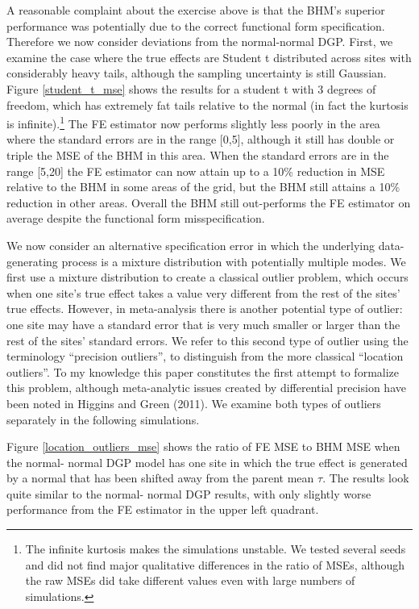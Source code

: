 \documentclass[12pt]{article}
\begin{document}
A reasonable complaint about the exercise above is that the BHM's superior performance was potentially due to the correct functional form specification. Therefore we now consider deviations from the  normal-normal DGP. First, we examine the case where the true effects are Student t distributed across sites with considerably heavy tails, although the sampling uncertainty is still Gaussian. Figure \ref{student_t_mse} shows the results for a student t with 3 degrees of freedom, which has extremely fat tails relative to the  normal (in fact the kurtosis is infinite).\footnote{The infinite kurtosis makes the simulations unstable. We tested several seeds and did not find major qualitative differences in the ratio of MSEs, although the raw MSEs did take different values even with large numbers of simulations.} The FE estimator now performs slightly less poorly in the area where the standard errors are in the range [0,5], although it still has double or triple the MSE of the BHM in this area. When the standard errors are in the range [5,20] the FE estimator can now attain up to a 10\% reduction in MSE relative to the BHM in some areas of the grid, but the BHM still attains a 10\% reduction in other areas. Overall the BHM still out-performs the FE estimator on average despite the functional form misspecification.

We now consider an alternative specification error in which the underlying data-generating process is a mixture distribution with potentially multiple modes. We first use a mixture distribution to create a classical outlier problem, which occurs when one site's true effect takes a value very different from the rest of the sites' true effects. However, in meta-analysis there is another potential type of outlier: one site may have a standard error that is very much smaller or larger than the rest of the sites' standard errors. We refer to this second type of outlier using the terminology ``precision outliers'', to distinguish from the more classical ``location outliers''. To my knowledge this paper constitutes the first attempt to formalize this problem, although meta-analytic issues created by differential precision have been noted in Higgins and Green (2011). We examine both types of outliers separately in the following simulations. 

Figure \ref{location_outliers_mse} shows the ratio of FE MSE to BHM MSE when the  normal- normal DGP model has one site in which the true effect is generated by a  normal that has been shifted away from the parent mean $\tau$. The results look quite similar to the normal- normal DGP results, with only slightly worse performance from the FE estimator in the upper left quadrant.
\end{document}
